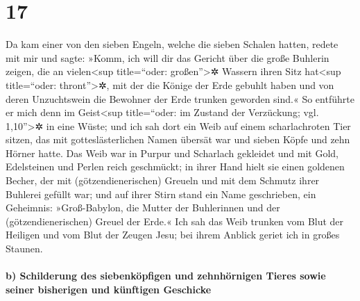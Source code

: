 \hypertarget{section-16}{%
\section{17}\label{section-16}}

 Da kam einer von den sieben Engeln, welche die sieben
Schalen hatten, redete mit mir und sagte: »Komm, ich will dir das
Gericht über die große Buhlerin zeigen, die an vielen\textless sup
title=``oder: großen''\textgreater✲ Wassern ihren Sitz hat\textless sup
title=``oder: thront''\textgreater✲,  mit der die Könige
der Erde gebuhlt haben und von deren Unzuchtswein die Bewohner der Erde
trunken geworden sind.«  So entführte er mich denn im
Geist\textless sup title=``oder: im Zustand der Verzückung; vgl.
1,10''\textgreater✲ in eine Wüste; und ich sah dort ein Weib auf einem
scharlachroten Tier sitzen, das mit gotteslästerlichen Namen übersät war
und sieben Köpfe und zehn Hörner hatte.  Das Weib war in
Purpur und Scharlach gekleidet und mit Gold, Edelsteinen und Perlen
reich geschmückt; in ihrer Hand hielt sie einen goldenen Becher, der mit
(götzendienerischen) Greueln und mit dem Schmutz ihrer Buhlerei gefüllt
war;  und auf ihrer Stirn stand ein Name geschrieben, ein
Geheimnis: »Groß-Babylon, die Mutter der Buhlerinnen und der
(götzendienerischen) Greuel der Erde.«  Ich sah das Weib
trunken vom Blut der Heiligen und vom Blut der Zeugen Jesu; bei ihrem
Anblick geriet ich in großes Staunen.

\hypertarget{b-schilderung-des-siebenkuxf6pfigen-und-zehnhuxf6rnigen-tieres-sowie-seiner-bisherigen-und-kuxfcnftigen-geschicke}{%
\paragraph{b) Schilderung des siebenköpfigen und zehnhörnigen Tieres
sowie seiner bisherigen und künftigen
Geschicke}\label{b-schilderung-des-siebenkuxf6pfigen-und-zehnhuxf6rnigen-tieres-sowie-seiner-bisherigen-und-kuxfcnftigen-geschicke}}


